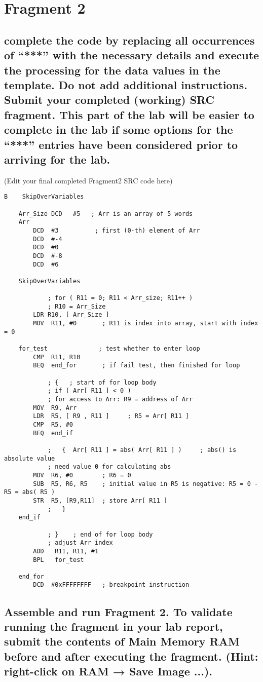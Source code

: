 \documentclass{article}
\begin{document}
	\pagebreak

	\section{Fragment 2}	
	\subsection{complete the code by replacing all occurrences of “***” with the necessary details and execute the processing for the data values in the template. Do not add additional instructions. Submit your completed (working) SRC fragment. This part of the lab will be easier to complete in the lab if some options for the “***” entries have been considered prior to arriving for the lab.}
	(Edit your final completed Fragment2 SRC code here)
	\begin{lstlisting}[style=CStyle]	
		B    SkipOverVariables
	
	Arr_Size DCD   #5   ; Arr is an array of 5 words
	Arr  
		DCD  #3          ; first (0-th) element of Arr
		DCD  #-4
		DCD  #0
		DCD  #-8
		DCD  #6 
	
	SkipOverVariables
	
			; for ( R11 = 0; R11 < Arr_size; R11++ )    
			; R10 = Arr_Size
		LDR R10, [ Arr_Size ]   
		MOV  R11, #0       ; R11 is index into array, start with index = 0
	
	for_test              ; test whether to enter loop
		CMP  R11, R10
		BEQ  end_for       ; if fail test, then finished for loop 
	
			; {   ; start of for loop body
			; if ( Arr[ R11 ] < 0 )
			; for access to Arr: R9 = address of Arr
		MOV  R9, Arr
		LDR  R5, [ R9 , R11 ]     ; R5 = Arr[ R11 ]
		CMP  R5, #0
		BEQ  end_if   
	
			;   {  Arr[ R11 ] = abs( Arr[ R11 ] )     ; abs() is absolute value  
			; need value 0 for calculating abs
		MOV  R6, #0        ; R6 = 0
		SUB  R5, R6, R5    ; initial value in R5 is negative: R5 = 0 - R5 = abs( R5 )
		STR  R5, [R9,R11]  ; store Arr[ R11 ]
			;   }
	end_if
	
			; }    ; end of for loop body
			; adjust Arr index
		ADD   R11, R11, #1
		BPL   for_test
	
	end_for
		DCD  #0xFFFFFFFF   ; breakpoint instruction	\end{lstlisting}
		
	\subsection{Assemble and run Fragment 2. To validate running the fragment in your lab report, submit the contents of Main Memory RAM before and after executing the fragment. (Hint: right-click on RAM → Save Image ...).}
	
\end{document}

